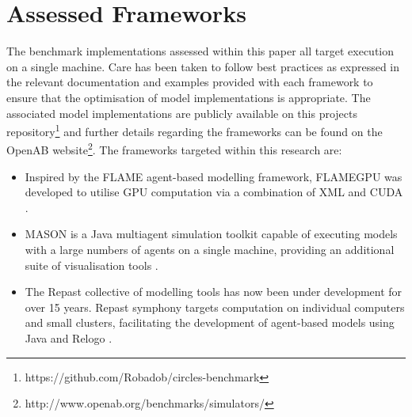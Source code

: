 \section{Assessed Frameworks\label{sec:assessed-frameworks}}
\vspace{-0.5cm}
The benchmark implementations assessed within this paper all target execution on a single machine. Care has been taken to follow best practices as expressed in the relevant documentation and examples provided with each framework to ensure that the optimisation of model implementations is appropriate. The associated model implementations are publicly available on this projects repository\footnote{https://github.com/Robadob/circles-benchmark} and further details regarding the frameworks can be found on the OpenAB website\footnote{http://www.openab.org/benchmarks/simulators/}.
The frameworks targeted within this research are:
\begin{itemize}
\item Inspired by the FLAME agent-based modelling framework, FLAMEGPU  was developed to utilise GPU computation via a combination of XML and CUDA \cite{RR082}. 
\item MASON is a Java multiagent simulation toolkit capable of executing models with a large numbers of agents on a single machine, providing an additional suite of visualisation tools \cite{LC*04}. 
\item The Repast collective of modelling tools has now been under development for over 15 years. Repast symphony targets computation on individual computers and small clusters, facilitating the development of agent-based models using Java and Relogo \cite{repast2013}.
\end{itemize}